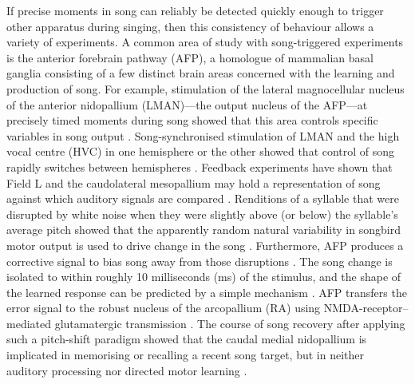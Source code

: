 \documentclass[10pt,letterpaper]{article}
\begin{document}
If precise moments in song can reliably be detected quickly enough to
trigger other apparatus during singing, then this consistency of
behaviour allows a variety of experiments.  A common area of study
with song-triggered experiments is the anterior forebrain pathway
(AFP), a homologue of mammalian basal ganglia consisting of a few
distinct brain areas concerned with the learning and production of
song.  For example, stimulation of the lateral magnocellular nucleus
of the anterior nidopallium (LMAN)---the output nucleus of the
AFP---at precisely timed moments during song showed that this area
controls specific variables in song output \cite{Kao2005}.
Song-synchronised stimulation of LMAN and the high vocal centre (HVC)
in one hemisphere or the other showed that control of song rapidly
switches between hemispheres \cite{Wang2008interhemispheric}.
Feedback experiments have shown that Field L and the caudolateral
mesopallium may hold a representation of song against which auditory
signals are compared \cite{Keller2009}.  Renditions of a syllable that
were disrupted by white noise when they were slightly above (or below)
the syllable's average pitch showed that the apparently random natural
variability in songbird motor output is used to drive change in the
song \cite{Tumer2007pitchshift}. Furthermore, AFP produces a
corrective signal to bias song away from those disruptions
\cite{Andalman2009}. The song change is isolated to within roughly 10
milliseconds (ms) of the stimulus, and the shape of the learned
response can be predicted by a simple mechanism
\cite{Charlesworth2011learning}. AFP transfers the error signal to the
robust nucleus of the arcopallium (RA) using NMDA-receptor--mediated
glutamatergic transmission \cite{Warren2011}. The course of song
recovery after applying such a pitch-shift paradigm showed that the
caudal medial nidopallium is implicated in memorising or recalling a
recent song target, but in neither auditory processing nor directed
motor learning \cite{Canopoli2014}.

\end{document}
